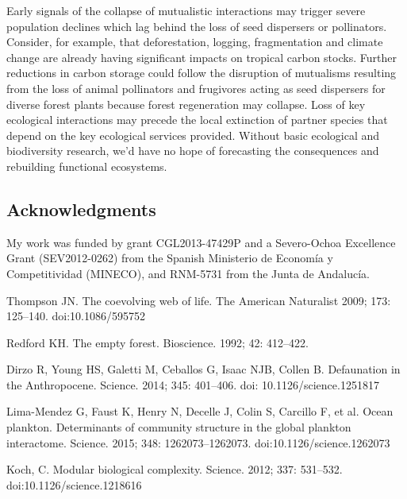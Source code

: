\documentclass[10pt,letterpaper]{article}
\begin{document}
Early signals of the collapse of mutualistic interactions may trigger severe population declines which lag behind the loss of seed dispersers or pollinators. Consider, for example, that deforestation, logging, fragmentation and climate change are already having significant impacts on tropical carbon stocks. Further reductions in carbon storage could follow the disruption of mutualisms resulting from the loss of animal pollinators and frugivores acting as seed dispersers for diverse forest plants because forest regeneration may collapse. Loss of key ecological interactions may precede the local extinction of partner species that depend on the key ecological services provided. Without basic ecological and biodiversity research, we’d have no hope of forecasting the consequences and rebuilding functional  ecosystems.


\subsection*{Acknowledgments}
My work was funded by grant CGL2013-47429P and a Severo-Ochoa Excellence Grant (SEV2012-0262) from the Spanish Ministerio de Econom\'ia y Competitividad (MINECO), and RNM-5731 from the Junta de Andaluc\'ia. 

\nolinenumbers

\begin{thebibliography}{10}
Thompson JN. The coevolving web of life. The American Naturalist 2009; 173: 125–140. doi:10.1086/595752

Redford KH. The empty forest. Bioscience. 1992; 42: 412–422. 

Dirzo R, Young HS, Galetti M, Ceballos G, Isaac NJB, Collen B. Defaunation in the Anthropocene. Science. 2014; 345: 401–406. doi: 10.1126/science.1251817

Lima-Mendez G, Faust K, Henry N, Decelle J, Colin S, Carcillo F, et al. Ocean plankton. Determinants of community structure in the global plankton interactome. Science. 2015; 348: 1262073–1262073. doi:10.1126/science.1262073

Koch, C. Modular biological complexity. Science. 2012; 337: 531–532. doi:10.1126/science.1218616

\end{thebibliography}

\newpage
\end{document}

